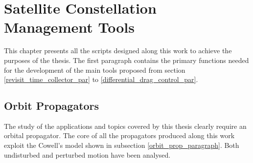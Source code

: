 \chapter{Satellite Constellation Management Tools} \label{chapter_tools}
This chapter presents all the scripts designed along this work to achieve the purposes of the thesis.
The first paragraph contains the primary functions needed for the development of the main tools proposed from section \ref{revisit_time_collector_par} to \ref{differential_drag_control_par}.


\section{Orbit Propagators} \label{orbit_propagators_par}
The study of the applications and topics covered by this thesis clearly require an orbital propagator.
The core of all the propagators produced along this work exploit the Cowell's model shown in subsection \ref{orbit_prop_paragraph}.
Both undisturbed and perturbed motion have been analysed.

